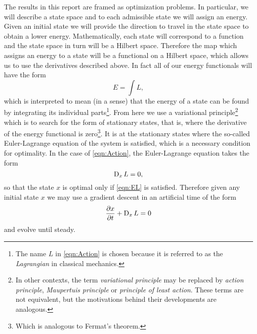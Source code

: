     The results in this report are framed as optimization problems.
    In particular, we will describe a state space and to each admissible
    state we will assign an energy. Given an initial state we will provide
    the direction to travel in the state space to obtain a lower energy.
    Mathematically, each state will correspond to a function and the state space 
    in turn will be a Hilbert space. Therefore the map which assigns an energy to 
    a state will be a functional on a Hilbert space, which allows us to
    use the derivatives described above. In fact all of our
    energy functionals will have the form
    \begin{equation}
        \label{eqn:Action}
        E = \int L,
    \end{equation}
    which is interpreted to mean (in a sense) that the energy of a state can 
    be found by integrating its individual 
    parts\footnote{The name \(L\) in
                    \autoref{eqn:Action} is chosen because it is
                    referred to as the \emph{Lagrangian} in classical
                    mechanics.}. 
    From here we use a variational 
    principle\footnote{In other contexts, the term
                        \emph{variational principle} may be replaced by \emph{action principle},
                        \emph{Maupertuis principle} or \emph{principle of least action}. These terms
                        are not equivalent, but the motivations behind their developments are
                        analogous.} 
    which is to search for the form of stationary states, that is, where the derivative of the 
    energy functional is zero\footnote{Which is analogous to Fermat's theorem.}. 
    It is at the stationary states where the so-called Euler-Lagrange equation 
    of the system is satisfied, which is a necessary condition for optimality.
    In the case of \autoref{eqn:Action}, the Euler-Lagrange equation
    takes the form
    \begin{equation}
        \label{eqn:EL}
        \operatorname{D}_x L = 0,
    \end{equation}
    so that the state \(x\) is optimal only if \autoref{eqn:EL} is
    satisfied. Therefore given any initial state \(x\) we may use a gradient descent 
    in an artificial time of the form
    \begin{equation}
        \label{eqn:Descent}
        \frac{\partial x}{\partial t} + \operatorname{D}_x L = 0     
    \end{equation}
    and evolve until steady.

